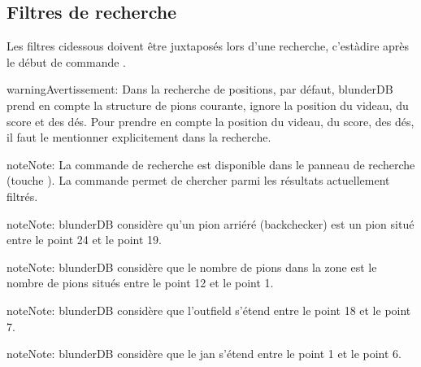 \documentclass[letterpaper,10pt,french]{sphinxmanual}
\begin{document}
\subsection{Filtres de recherche}
\label{\detokenize{cmd_mode:filtres-de-recherche}}\label{\detokenize{cmd_mode:cmd-filter}}
\sphinxAtStartPar
Les filtres ci\sphinxhyphen{}dessous doivent être juxtaposés lors d’une recherche,
c’est\sphinxhyphen{}à\sphinxhyphen{}dire après le début de commande .

\label{\detokenize{cmd_mode:cmd-filter-pos}}
\begin{sphinxadmonition}{warning}{Avertissement:}
\sphinxAtStartPar
Dans la recherche de positions, par défaut, blunderDB prend en
compte la structure de pions courante, ignore la position du videau, du
score et des dés. Pour prendre en compte la position du videau, du score,
des dés, il faut le mentionner explicitement dans la recherche.
\end{sphinxadmonition}

\begin{sphinxadmonition}{note}{Note:}
\sphinxAtStartPar
La commande de recherche  est disponible dans le panneau de recherche
(touche ). La commande  permet de chercher parmi les
résultats actuellement filtrés.
\end{sphinxadmonition}

\begin{sphinxadmonition}{note}{Note:}
\sphinxAtStartPar
blunderDB considère qu’un pion arriéré (backchecker) est un pion
situé entre le point 24 et le point 19.
\end{sphinxadmonition}

\begin{sphinxadmonition}{note}{Note:}
\sphinxAtStartPar
blunderDB considère que le nombre de pions dans la zone est le nombre
de pions situés entre le point 12 et le point 1.
\end{sphinxadmonition}

\begin{sphinxadmonition}{note}{Note:}
\sphinxAtStartPar
blunderDB considère que l’outfield s’étend entre le point 18 et le point 7.
\end{sphinxadmonition}

\begin{sphinxadmonition}{note}{Note:}
\sphinxAtStartPar
blunderDB considère que le jan s’étend entre le point 1 et le point 6.
\end{sphinxadmonition}
\end{document}
